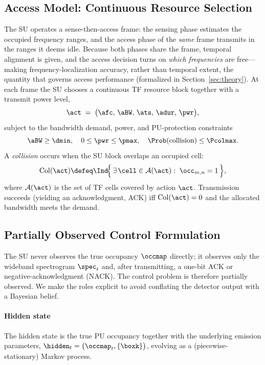 \subsection{Access Model: Continuous Resource Selection}
\label{subsec:access}
The SU operates a sense-then-access frame: the sensing phase estimates the
occupied frequency ranges, and the access phase of the \emph{same} frame
transmits in the ranges it deems idle. Because both phases share the frame,
temporal alignment is given, and the access decision turns on \emph{which
frequencies} are free---making frequency-localization accuracy, rather than
temporal extent, the quantity that governs access performance (formalized in
Section~\ref{sec:theory}). At each frame the SU chooses a continuous TF
resource block together with a transmit power level,
\begin{equation}
\act \;=\; \bigl(\afc,\, \aBW,\, \ats,\, \adur,\, \pwr\bigr),
\label{eq:action}
\end{equation}
subject to the bandwidth demand, power, and PU-protection constraints
\begin{equation}
\aBW \ge \dmin, \quad 0 \le \pwr \le \pmax, \quad
\Prob(\text{collision}) \le \Pcolmax .
\label{eq:constraints}
\end{equation}
A \emph{collision} occurs when the SU block overlaps an occupied cell:
\begin{equation}
\mathrm{Col}(\act) \defeq
\Ind\!\Bigl\{\, \exists\,\cell \in \mathcal{A}(\act):\; \occ_{m,n}=1 \,\Bigr\},
\label{eq:collision}
\end{equation}
where $\mathcal{A}(\act)$ is the set of TF cells covered by action $\act$.
Transmission succeeds (yielding an acknowledgment, ACK) iff $\mathrm{Col}(\act)=0$ and the
allocated bandwidth meets the demand.

\subsection{Partially Observed Control Formulation}
\label{subsec:pomdp}
The SU never observes the true occupancy $\occmap$ directly; it observes only
the wideband spectrogram $\spec_t$ and, after transmitting, a one-bit
ACK or negative-acknowledgment (NACK). The control problem is therefore
partially observed. We make the
roles explicit to avoid conflating the detector output with a Bayesian
belief.

\paragraph*{Hidden state} The hidden state is the true PU occupancy together
with the underlying emission parameters,
$\hidden_t=\bigl(\occmap_t,\{\boxk\}\bigr)$, evolving as a
(piecewise-stationary) Markov process.

